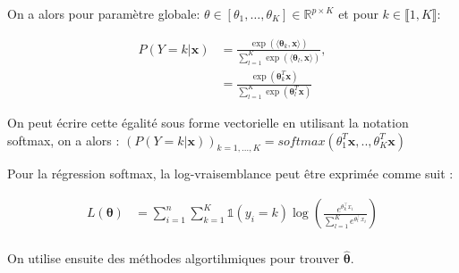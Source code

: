 \documentclass{article}
\begin{document}
On a alors pour paramètre globale: \(\theta \in [\theta_1, \ldots, \theta_K] \in \mathbb{R}^{p\times K}\) et pour \(k \in \llbracket 1, K \rrbracket\):

\begin{align*}
    P(Y=k | \bm{x}) &= \frac{\exp(\langle \boldsymbol{\theta}_k, \bm{x} \rangle)}{\sum_{l=1}^{K} \exp(\langle \boldsymbol{\theta}_l, \bm{x} \rangle)}, \\
    &= \frac{\exp(\boldsymbol{\theta}_k^T \bm{x})}{\sum_{l=1}^{K} \exp(\boldsymbol{\theta}_l^T \bm{x})}
\end{align*}


On peut écrire cette égalité sous forme vectorielle en utilisant la notation softmax, on a alors :
$(P(Y=k | \bm{x}))_{k=1,...,K}=softmax(\theta_1^T\bm{x},..,\theta_K^T\bm{x})$

Pour la régression softmax, la log-vraisemblance peut être exprimée comme suit :

\begin{align*}
L(\bm{\theta}) &= \sum_{i=1}^{n} \sum_{k=1}^{K} \mathds{1}(y_i = k) \log\left(\frac{e^{\theta_k^\top x_i}}{\sum_{l=1}^{K} e^{\theta_l^\top x_i}}\right) \\
\end{align*}

On utilise ensuite des méthodes algortihmiques pour trouver    $\bm{\hat{\theta}}$.
\end{document}
